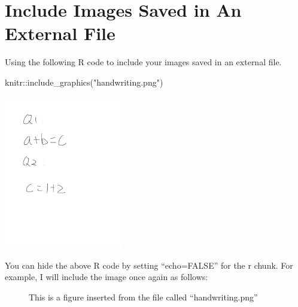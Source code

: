 \documentclass[
  letterpaper,
]{scrbook}
\newenvironment{Shaded}{\begin{snugshade}}{\end{snugshade}}
\newcommand{\FunctionTok}[1]{\textcolor[rgb]{0.28,0.35,0.67}{#1}}
\newcommand{\NormalTok}[1]{\textcolor[rgb]{0.00,0.23,0.31}{#1}}
\newcommand{\SpecialCharTok}[1]{\textcolor[rgb]{0.37,0.37,0.37}{#1}}
\newcommand{\StringTok}[1]{\textcolor[rgb]{0.13,0.47,0.30}{#1}}
\begin{document}
\section{Include Images Saved in An External
File}\label{include-images-saved-in-an-external-file}

Using the following R code to include your images saved in an external
file.

\begin{Shaded}
\begin{Highlighting}[]
\NormalTok{knitr}\SpecialCharTok{::}\FunctionTok{include\_graphics}\NormalTok{(}\StringTok{"handwriting.png"}\NormalTok{)}
\end{Highlighting}
\end{Shaded}

\includegraphics[width=2.04in,height=\textheight]{unit1-introR/handwriting.png}

You can hide the above R code by setting ``echo=FALSE'' for the r chunk.
For example, I will include the image once again as follows:

\begin{figure}


\caption{\label{fig-handwriting}This is a figure inserted from the file
called ``handwriting.png''}

\end{figure}%
\end{document}
